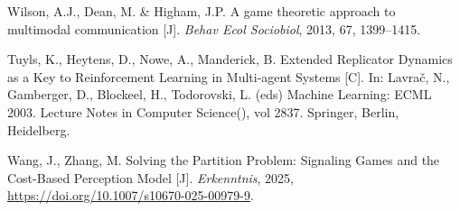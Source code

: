 \documentclass[12pt]{ctexart}  %
\begin{document}
\begin{thebibliography}{99}
 Wilson, A.J., Dean, M. \& Higham, J.P. A game theoretic approach to multimodal communication [J]. \textit{Behav Ecol Sociobiol}, 2013, 67, 1399–1415.

 Tuyls, K., Heytens, D., Nowe, A., Manderick, B. Extended Replicator Dynamics as a Key to Reinforcement Learning in Multi-agent Systems [C]. In: Lavrač, N., Gamberger, D., Blockeel, H., Todorovski, L. (eds) Machine Learning: ECML 2003. Lecture Notes in Computer Science(), vol 2837. Springer, Berlin, Heidelberg.

 Wang, J., Zhang, M. Solving the Partition Problem: Signaling Games and the Cost-Based Perception Model [J]. \textit{Erkenntnis}, 2025, \url{https://doi.org/10.1007/s10670-025-00979-9}.
\end{thebibliography}

\end{document}
